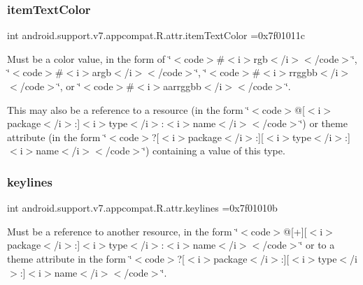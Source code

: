 \subsubsection{\texorpdfstring{item\+Text\+Color}{itemTextColor}}
{\footnotesize\ttfamily int android.\+support.\+v7.\+appcompat.\+R.\+attr.\+item\+Text\+Color =0x7f01011c\hspace{0.3cm}{\ttfamily [static]}}

Must be a color value, in the form of \char`\"{}$<$code$>$\#$<$i$>$rgb$<$/i$>$$<$/code$>$\char`\"{}, \char`\"{}$<$code$>$\#$<$i$>$argb$<$/i$>$$<$/code$>$\char`\"{}, \char`\"{}$<$code$>$\#$<$i$>$rrggbb$<$/i$>$$<$/code$>$\char`\"{}, or \char`\"{}$<$code$>$\#$<$i$>$aarrggbb$<$/i$>$$<$/code$>$\char`\"{}. 

This may also be a reference to a resource (in the form \char`\"{}$<$code$>$@\mbox{[}$<$i$>$package$<$/i$>$\+:\mbox{]}$<$i$>$type$<$/i$>$\+:$<$i$>$name$<$/i$>$$<$/code$>$\char`\"{}) or theme attribute (in the form \char`\"{}$<$code$>$?\mbox{[}$<$i$>$package$<$/i$>$\+:\mbox{]}\mbox{[}$<$i$>$type$<$/i$>$\+:\mbox{]}$<$i$>$name$<$/i$>$$<$/code$>$\char`\"{}) containing a value of this type. \mbox{\label{classandroid_1_1support_1_1v7_1_1appcompat_1_1R_1_1attr_a96514f8a1e5f958fbf3a5ef892543368}} 
\subsubsection{\texorpdfstring{keylines}{keylines}}
{\footnotesize\ttfamily int android.\+support.\+v7.\+appcompat.\+R.\+attr.\+keylines =0x7f01010b\hspace{0.3cm}{\ttfamily [static]}}

Must be a reference to another resource, in the form \char`\"{}$<$code$>$@\mbox{[}+\mbox{]}\mbox{[}$<$i$>$package$<$/i$>$\+:\mbox{]}$<$i$>$type$<$/i$>$\+:$<$i$>$name$<$/i$>$$<$/code$>$\char`\"{} or to a theme attribute in the form \char`\"{}$<$code$>$?\mbox{[}$<$i$>$package$<$/i$>$\+:\mbox{]}\mbox{[}$<$i$>$type$<$/i$>$\+:\mbox{]}$<$i$>$name$<$/i$>$$<$/code$>$\char`\"{}. \mbox{\label{classandroid_1_1support_1_1v7_1_1appcompat_1_1R_1_1attr_ab829778c3ab95012bde4b7a24c7a489e}} 
